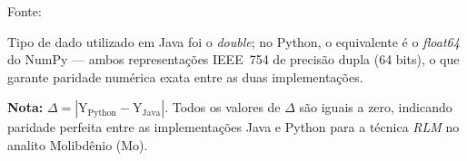 \begin{table}[H]
\begin{threeparttable}
\begin{center}
\begin{minipage}{0.85\linewidth}
\begin{tablenotes}
\footnotesize
\item Fonte:~\oautor
\item[a] Tipo de dado utilizado em Java foi o \textit{double}; no Python,
o equivalente é o \textit{float64} do NumPy — ambos representações IEEE~754
de precisão dupla (64 bits), o que garante paridade numérica exata entre as
duas implementações.
\item \textbf{Nota:} $\Delta = |\text{Y}_{\text{Python}} - \text{Y}_{\text{Java}}|$.
Todos os valores de $\Delta$ são iguais a zero, indicando paridade
perfeita entre as implementações Java e Python para a técnica \textit{RLM}
no analito Molibdênio (Mo).
\end{tablenotes}
\end{minipage}
\end{center}
\end{threeparttable}
\end{table}

